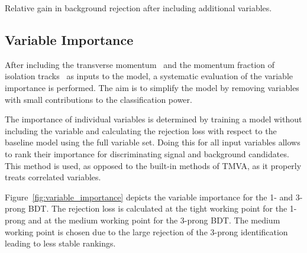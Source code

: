 \begin{table}[htb]
  \centering
  {\small}
  \caption{Relative gain in background rejection after including additional
    variables.}
  \label{tab:bdt_new_variables}
\end{table}

\subsection{Variable Importance}
\label{sec:bdt_var_importance}

After including the transverse momentum~ and
the momentum fraction of isolation tracks~ as
inputs to the model, a systematic evaluation of the variable importance is
performed. The aim is to simplify the model by removing variables with small
contributions to the classification power.

The importance of individual variables is determined by training a model without
including the variable and calculating the rejection loss with respect to the
baseline model using the full variable set. Doing this for all input variables
allows to rank their importance for discriminating signal and background
\tauhadvis candidates. This method is used, as opposed to the built-in methods
of TMVA, as it properly treats correlated variables.

Figure~\ref{fig:variable_importance} depicts the variable importance for the 1-
and 3-prong BDT. The rejection loss is calculated at the tight working point for
the 1-prong and at the medium working point for the 3-prong BDT. The medium
working point is chosen due to the large rejection of the 3-prong identification
leading to less stable rankings.

